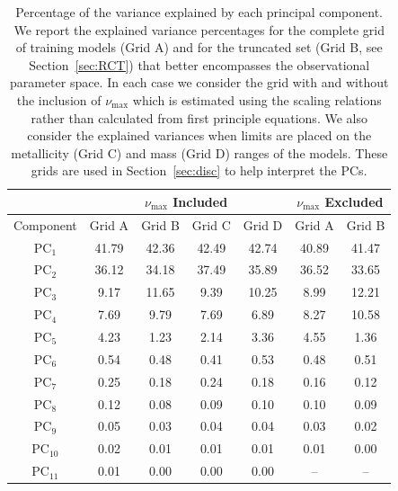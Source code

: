 \begin{table}
\centering
\caption{Percentage of the variance explained by each principal component. We report the explained variance percentages for the complete grid of training models (Grid A) and for the truncated set (Grid B, see Section~\ref{sec:RCT}) that better encompasses the observational parameter space. In each case we consider the grid with and without the inclusion of $\nu_{\max}$ which is estimated using the \citet{1995AA...293...87K} scaling relations rather than calculated from first principle equations. We also consider the explained variances when limits are placed on the metallicity (Grid C) and mass (Grid D) ranges of the models.  These grids are used in Section~\ref{sec:disc} to help interpret the PCs. \label{tab:PCAEV}} 

\begin{tabular}{c|cccc|cc}
        \multicolumn{1}{c}{}  &
        \multicolumn{4}{c|}{$\nu_{\max}$ Included}               &
        \multicolumn{2}{c}{$\nu_{\max}$ Excluded}\\\hline
        Component  &
        Grid A &
        Grid B &
        Grid C &
        Grid D &
        Grid A &
        Grid B \\\hline
PC$_1$ 	&	41.79	&	42.36	& 42.49 & 42.74 &	40.89	&	41.47	\\
PC$_2$ 	&	36.12	&	34.18	& 37.49 & 35.89 &	36.52	&	33.65	\\
PC$_3$	&	9.17	&	11.65	& 9.39  & 10.25 &	8.99	&	12.21	\\
PC$_4$	&	7.69	&	9.79	& 7.69  &  6.89 &	8.27	&	10.58	\\
PC$_5$ 	&	4.23	&	1.23	& 2.14  &  3.36 &	4.55	&	1.36	\\
PC$_6$	&	0.54	&	0.48	&0.41    & 0.53   &	0.48	&	0.51	\\
PC$_7$	&	0.25	&	0.18	&0.24    &0.18    &	0.16	&	0.12	\\
PC$_8$ 	&	0.12	&	0.08	&0.09    &0.10    &	0.10	&	0.09	\\
PC$_9$	&	0.05	&	0.03	&0.04    &0.04    &	0.03	&	0.02	\\
PC$_{10}$ 	&	0.02	&	0.01 &0.01   &0.01	&	0.01	&	0.00	\\
PC$_{11}$	&	0.01	&	0.00 &0.00   &0.00     &	--	    &	--	
\end{tabular}
\end{table}

